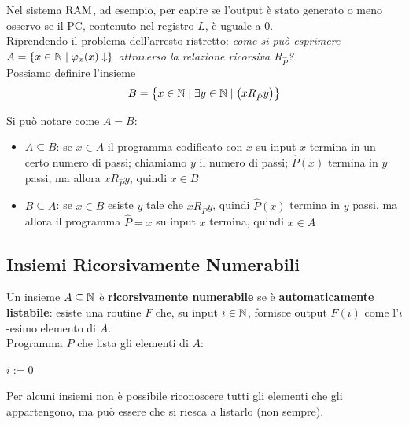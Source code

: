 Nel sistema $\text{RAM}$, ad esempio, per capire se l'output è stato generato o meno osservo se il PC, contenuto nel registro $L$, è uguale a 0.\\

Riprendendo il problema dell'arresto ristretto: \textit{come si può esprimere $A = \left\{x \in \mathbb{N} \mid \varphi_x (x) \downarrow\right\}$ attraverso la relazione ricorsiva $R_{\hat{P}}$?}\\

Possiamo definire l'insieme
$$ B = \left\{x \in \mathbb{N} \mid \exists y \in \mathbb{N} \mid \left(xR_{\hat{P}}y\right)\right\} $$

Si può notare come $A = B$:
\begin{itemize}
	\item $A \subseteq B$: se $x \in A$ il programma codificato con $x$ su input $x$ termina in un certo numero di passi; chiamiamo $y$ il numero di passi; $\hat{P}(x)$ termina in $y$ passi, ma allora $xR_{\hat{P}} y$, quindi $x \in B$
	\item $B \subseteq A$: se $x \in B$ esiste $y$ tale che $xR_{\hat{P}}y$, quindi $\hat{P}(x)$ termina in $y$ passi, ma allora il programma $\hat{P} = x$ su input $x$ termina, quindi $x \in A$
\end{itemize}

\subsection{Insiemi Ricorsivamente Numerabili}

Un insieme $A \subseteq \mathbb{N}$ è \textbf{ricorsivamente numerabile} se è \textbf{automaticamente listabile}: esiste una routine $F$ che, su input $i \in \mathbb{N}$, fornisce output $F(i)$ come l'$i$-esimo elemento di $A$. \\

Programma $P$ che lista gli elementi di $A$:

\vspace{1em}
\hspace{2em}
\begin{minipage}{.32\textwidth}
	\begin{tcolorbox}[
		colback=white,
		sharp corners,
		boxrule=.3mm,
		left=20pt
		]
		\begin{algorithm}[H]
			\SetAlgoNoEnd
			$i:=0$ \\
		\end{algorithm}
	\end{tcolorbox}
\end{minipage}
\hspace{2em}
\begin{minipage}{.6\textwidth}
	Per alcuni insiemi non è possibile riconoscere tutti gli elementi che gli appartengono, ma può essere che si riesca a listarlo (non sempre).
\end{minipage}

